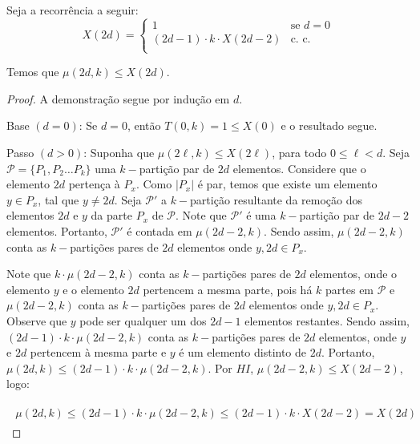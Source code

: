 \documentclass[12pt]{article}
\begin{document}
    
  \begin{lema}  
  	\label{lema6} 
  	Seja a recorrência a seguir: \\
  	
  	\begin{equation}
  		X(2d) =
  		\begin{cases}
  			1 & \text{se $d = 0$}\\
  			(2d - 1) {\cdot} k {\cdot} X(2d - 2) & \text{c. c.} \\ 
  		\end{cases}
  	\end{equation}
  	
  	Temos que $\mu(2d, k) \leq X(2d)$.
  \end{lema}
  
  \begin{proof} 
  	A demonstração segue por indução em $d$. \newl
  	
  	Base $(d = 0)$: Se $d=0$, então $T(0, k) = 1 \leq X(0)$ e o resultado segue. \newl
  	
  	Passo $(d > 0)$: Suponha que $\mu(2\ell, k) \leq X(2\ell)$, para todo $0 \leq \ell < d$. Seja $\mathcal{P}= \{P_1, P_2 \ldots P_k\}$ uma $k-$partição par de $2d$ elementos. Considere que o elemento $2d$ pertença à $P_x$. Como $|P_x|$ é par, temos que existe um elemento $y \in P_x$, tal que $y \neq 2d$. Seja $\mathcal{P'}$ a $k-$partição resultante da remoção dos elementos $2d$ e $y$ da parte $P_x$ de $\mathcal{P}$. Note que $\mathcal{P'}$ é uma $k-$partição par de $2d - 2$ elementos. Portanto, $\mathcal{P'}$ é contada em $\mu(2d - 2, k)$. Sendo assim, $\mu(2d - 2, k)$ conta as $k-$partições pares de $2d$ elementos onde $y, 2d \in P_x$. 
  	
  	Note que $k {\cdot} \mu(2d - 2, k)$ conta as $k-$partições pares de $2d$ elementos, onde o elemento $y$ e o elemento $2d$ pertencem a mesma parte, pois há $k$ partes em $\mathcal{P}$ e $\mu(2d - 2, k)$ conta as $k-$partições pares de $2d$ elementos onde $y, 2d \in P_x$. Observe que $y$ pode ser qualquer um dos $2d - 1$ elementos restantes. Sendo assim, $(2d - 1) {\cdot} k {\cdot} \mu(2d - 2, k)$ conta as $k-$partições pares de $2d$ elementos, onde $y$ e $2d$ pertencem à mesma parte e $y$ é um elemento distinto de $2d$. Portanto, $\mu(2d, k) \leq (2d - 1) {\cdot} k {\cdot} \mu(2d - 2, k)$. Por $HI$, $\mu(2d - 2, k) \leq X(2d - 2)$, logo:
  	
  	\begin{align}
  		\begin{split}
  			\mu(2d, k) \leq (2d - 1) {\cdot} k {\cdot} \mu(2d - 2, k) \leq (2d - 1) {\cdot} k {\cdot} X(2d - 2) = X(2d)
  		\end{split} 
  	\end{align} 
  	
  \end{proof} \enlargethispage{-3\baselineskip}
\end{document}
